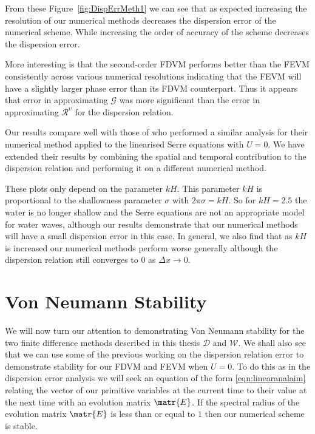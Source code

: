 From these Figure~\ref{fig:DispErrMeth1} we can see that as expected increasing the resolution of our numerical methods decreases the dispersion error of the numerical scheme. While increasing the order of accuracy of the scheme decreases the dispersion error. 

More interesting is that the second-order FDVM performs better than the FEVM consistently across various numerical resolutions indicating that the FEVM will have a slightly larger phase error than its FDVM counterpart. Thus it appears that error in approximating $\mathcal{G}$ was more significant than the error in approximating $\mathcal{R}^{\upsilon}$ for the dispersion relation.

Our results compare well with those of \cite{Filippini-etal-2016-381} who performed a similar analysis for their numerical method applied to the linearised Serre equations with $U=0$. We have extended their results by combining the spatial and temporal contribution to the dispersion relation and performing it on a different numerical method. 

These plots only depend on the parameter $kH$. This parameter $kH$ is proportional to the shallowness parameter $\sigma$ with $2 \pi \sigma = kH $. So for $kH=2.5$ the water is no longer shallow and the Serre equations are not an appropriate model for water waves, although our results demonstrate that our numerical methods will have a small dispersion error in this case. In general, we also find that as $kH$ is increased our numerical methods perform worse generally although the dispersion relation still converges to $0$ as $\Delta x \rightarrow 0$. 


\section{Von Neumann Stability}
We will now turn our attention to demonstrating Von Neumann stability for the two finite difference methods described in this thesis $\mathcal{D}$ and $\mathcal{W}$. We shall also see that we can use some of the previous working on the dispersion relation error to demonstrate stability for our FDVM and FEVM when $U=0$. To do this as in the dispersion error analysis we will seek an equation of the form \ref{eqn:linearanalaim} relating the vector of our primitive variables at the current time to their value at the next time with an evolution matrix $\matr{E}$. If the spectral radius of the evolution matrix $\matr{E}$ is less than or equal to $1$ then our numerical scheme is stable.

